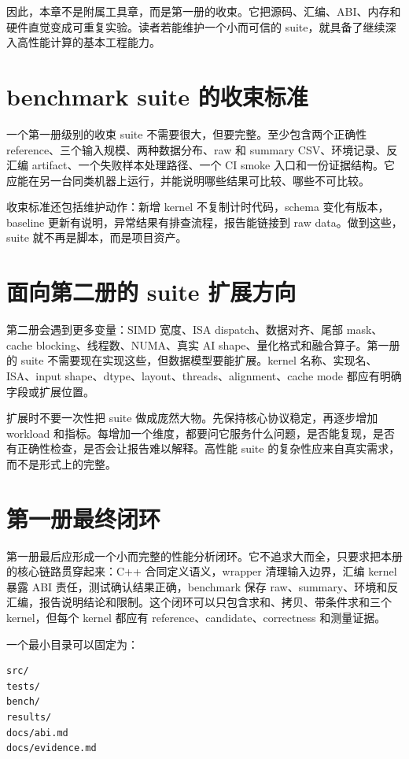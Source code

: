 因此，本章不是附属工具章，而是第一册的收束。它把源码、汇编、ABI、内存和硬件直觉变成可重复实验。读者若能维护一个小而可信的 suite，就具备了继续深入高性能计算的基本工程能力。

\section{benchmark suite 的收束标准}

一个第一册级别的收束 suite 不需要很大，但要完整。至少包含两个正确性 reference、三个输入规模、两种数据分布、raw 和 summary CSV、环境记录、反汇编 artifact、一个失败样本处理路径、一个 CI smoke 入口和一份证据结构。它应能在另一台同类机器上运行，并能说明哪些结果可比较、哪些不可比较。

收束标准还包括维护动作：新增 kernel 不复制计时代码，schema 变化有版本，baseline 更新有说明，异常结果有排查流程，报告能链接到 raw data。做到这些，suite 就不再是脚本，而是项目资产。

\section{面向第二册的 suite 扩展方向}

第二册会遇到更多变量：SIMD 宽度、ISA dispatch、数据对齐、尾部 mask、cache blocking、线程数、NUMA、真实 AI shape、量化格式和融合算子。第一册的 suite 不需要现在实现这些，但数据模型要能扩展。kernel 名称、实现名、ISA、input shape、dtype、layout、threads、alignment、cache mode 都应有明确字段或扩展位置。

扩展时不要一次性把 suite 做成庞然大物。先保持核心协议稳定，再逐步增加 workload 和指标。每增加一个维度，都要问它服务什么问题，是否能复现，是否有正确性检查，是否会让报告难以解释。高性能 suite 的复杂性应来自真实需求，而不是形式上的完整。

\section{第一册最终闭环}

第一册最后应形成一个小而完整的性能分析闭环。它不追求大而全，只要求把本册的核心链路贯穿起来：C++ 合同定义语义，wrapper 清理输入边界，汇编 kernel 暴露 ABI 责任，测试确认结果正确，benchmark 保存 raw、summary、环境和反汇编，报告说明结论和限制。这个闭环可以只包含求和、拷贝、带条件求和三个 kernel，但每个 kernel 都应有 reference、candidate、correctness 和测量证据。

一个最小目录可以固定为：

\begin{lstlisting}
src/
tests/
bench/
results/
docs/abi.md
docs/evidence.md
\end{lstlisting}

